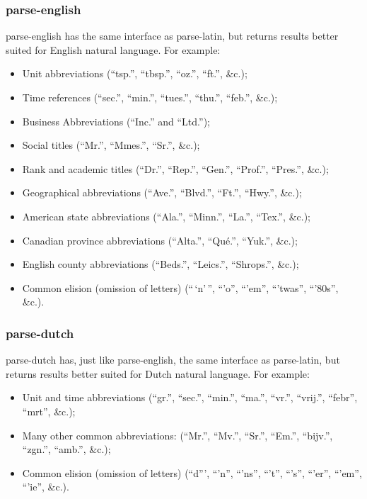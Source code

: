 \subsubsection{parse-english}\label{parse-english}

parse-english has the same interface as parse-latin, but returns results
better suited for English natural language. For example:

\begin{itemize}
\itemsep1pt\parskip0pt
\item
  Unit abbreviations (``tsp.'', ``tbsp.'', ``oz.'', ``ft.'', \&c.);
\item
  Time references (``sec.'', ``min.'', ``tues.'', ``thu.'', ``feb.'',
  \&c.);
\item
  Business Abbreviations (``Inc.'' and ``Ltd.'');
\item
  Social titles (``Mr.'', ``Mmes.'', ``Sr.'', \&c.);
\item
  Rank and academic titles (``Dr.'', ``Rep.'', ``Gen.'', ``Prof.'',
  ``Pres.'', \&c.);
\item
  Geographical abbreviations (``Ave.'', ``Blvd.'', ``Ft.'', ``Hwy.'',
  \&c.);
\item
  American state abbreviations (``Ala.'', ``Minn.'', ``La.'', ``Tex.'',
  \&c.);
\item
  Canadian province abbreviations (``Alta.'', ``Qué.'', ``Yuk.'', \&c.);
\item
  English county abbreviations (``Beds.'', ``Leics.'', ``Shrops.'',
  \&c.);
\item
  Common elision (omission of letters) (``\,`n'\,'', ``'o'', ``'em'',
  ``'twas'', ``'80s'', \&c.).
\end{itemize}

\subsubsection{parse-dutch}\label{parse-dutch}

parse-dutch has, just like parse-english, the same interface as
parse-latin, but returns results better suited for Dutch natural
language. For example:

\begin{itemize}
\itemsep1pt\parskip0pt
\item
  Unit and time abbreviations (``gr.'', ``sec.'', ``min.'', ``ma.'',
  ``vr.'', ``vrij.'', ``febr'', ``mrt'', \&c.);
\item
  Many other common abbreviations: (``Mr.'', ``Mv.'', ``Sr.'', ``Em.'',
  ``bijv.'', ``zgn.'', ``amb.'', \&c.);
\item
  Common elision (omission of letters) (``d''', ``'n'', ``'ns'', ``'t'',
  ``'s'', ``'er'', ``'em'', ``'ie'', \&c.).
\end{itemize}

